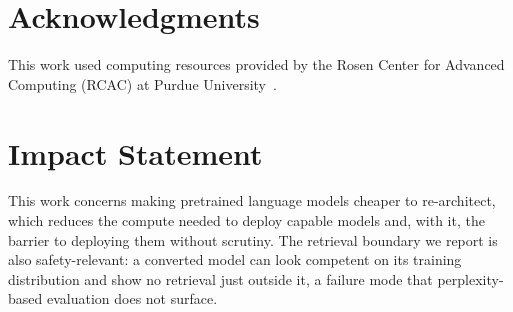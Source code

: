 \documentclass{article}
\begin{document}
\section*{Acknowledgments}
This work used computing resources provided by the Rosen Center for Advanced Computing (RCAC) at Purdue University~\citep{McCartney2014}.

\section*{Impact Statement}
This work concerns making pretrained language models cheaper to re-architect, which reduces the compute needed to deploy capable models and, with it, the barrier to deploying them without scrutiny. The retrieval boundary we report is also safety-relevant: a converted model can look competent on its training distribution and show no retrieval just outside it, a failure mode that perplexity-based evaluation does not surface.

\setlength{\bibsep}{1pt}


\end{document}
